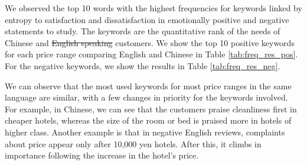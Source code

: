 \documentclass[smallextended,natbib]{svjour3}       %
\providecommand{\DIFadd}[1]{{\protect\color{blue}\uwave{#1}}} %
\providecommand{\DIFdel}[1]{{\protect\color{red}\sout{#1}}}                      %
\providecommand{\DIFaddbegin}{} %
\providecommand{\DIFaddend}{} %
\providecommand{\DIFdelbegin}{} %
\providecommand{\DIFdelend}{} %
\newcommand{\DIFscaledelfig}{0.5}
\newlength{\DIFdelgraphicswidth} %
\newlength{\DIFdelgraphicsheight} %
\newcommand{\DIFaddincludegraphics}[2][]{{\color{blue}\fbox{\DIFOincludegraphics[#1]{#2}}}} %
\newcommand{\DIFdelincludegraphics}[2][]{%
\sbox{\DIFdelgraphicsbox}{\DIFOincludegraphics[#1]{#2}}%
\settoboxwidth{\DIFdelgraphicswidth}{\DIFdelgraphicsbox} %
\settoboxtotalheight{\DIFdelgraphicsheight}{\DIFdelgraphicsbox} %
\scalebox{\DIFscaledelfig}{%
\parbox[b]{\DIFdelgraphicswidth}{\usebox{\DIFdelgraphicsbox}\\[-\baselineskip] \rule{\DIFdelgraphicswidth}{0em}}\llap{\resizebox{\DIFdelgraphicswidth}{\DIFdelgraphicsheight}{%
\setlength{\unitlength}{\DIFdelgraphicswidth}%
\begin{picture}(1,1)%
\thicklines\linethickness{2pt} %
{\color[rgb]{1,0,0}\put(0,0){\framebox(1,1){}}}%
{\color[rgb]{1,0,0}\put(0,0){\line( 1,1){1}}}%
{\color[rgb]{1,0,0}\put(0,1){\line(1,-1){1}}}%
\end{picture}%
}\hspace*{3pt}}} %
} %
\DeclareRobustCommand{\DIFaddbegin}{\DIFOaddbegin \let\includegraphics\DIFaddincludegraphics} %
\DeclareRobustCommand{\DIFaddend}{\DIFOaddend \let\includegraphics\DIFOincludegraphics} %
\DeclareRobustCommand{\DIFdelbegin}{\DIFOdelbegin \let\includegraphics\DIFdelincludegraphics} %
\DeclareRobustCommand{\DIFdelend}{\DIFOaddend \let\includegraphics\DIFOincludegraphics} %
\begin{document}
    We observed the top 10 words with the highest frequencies for keywords linked by entropy to satisfaction and dissatisfaction in emotionally positive and negative statements to study. The keywords are the quantitative rank of the needs of Chinese and \DIFdelbegin \DIFdel{English speaking }\DIFdelend \DIFaddbegin \DIFadd{English-speaking }\DIFaddend customers. We show the top 10 positive keywords for each price range comparing English and Chinese in Table \ref{tab:freq_res_pos}. For the negative keywords, we show the results in Table \ref{tab:freq_res_neg}.

    We can observe that the most used keywords for most price ranges in the same language are similar, with a few changes in priority for the keywords involved. For example, in Chinese, we can see that the customers praise cleanliness first in cheaper hotels, whereas the size of the room or bed is praised more in hotels of higher class. Another example is that in negative English reviews, complaints about price appear only after 10,000 yen hotels. After this, it climbs in importance following the increase in the hotel's price.
\end{document}
